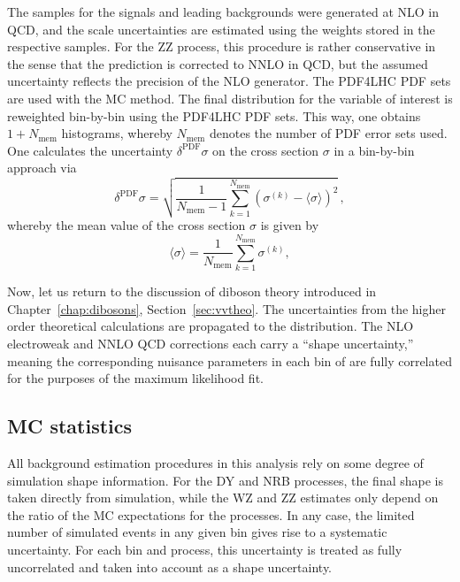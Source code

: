 The samples for the signals and leading backgrounds were generated at NLO in QCD,
and the scale uncertainties are estimated using the weights
stored in the respective samples. For the ZZ process, this procedure is rather conservative
in the sense that the prediction is corrected to NNLO in QCD, but the assumed uncertainty reflects
the precision of the NLO generator.
The PDF4LHC PDF sets are used with the MC method.
The final distribution for the variable of interest is 
reweighted bin-by-bin using the PDF4LHC PDF sets.
This way, one obtains $1+N_{\textrm{mem}}$ histograms, whereby
$N_{\textrm{mem}}$ denotes the number of PDF error sets used. One
calculates the uncertainty $\delta^{\textrm{PDF}}\sigma$ on the cross
section $\sigma$ in a bin-by-bin approach via 
\begin{equation}
\delta^{\textrm{PDF}} \sigma= \sqrt{ \frac{1}{N_{\textrm{mem}} - 1} \sum_{k=1}^{N_{\textrm{mem}}} \left(\sigma^{(k)} - \langle \sigma \rangle\right)^2 }\,,
\end{equation}
whereby the mean value of the cross section $\sigma$ is given by
\begin{equation}
\langle\sigma\rangle = \frac{1}{N_{\textrm{mem}}} \sum_{k=1}^{N_{\textrm{mem}}} \sigma^{(k)},
\end{equation}

Now, let us return to the discussion of diboson theory introduced in Chapter~\ref{chap:dibosons}, Section~\ref{sec:vvtheo}.
The uncertainties from the higher order theoretical calculations are propagated to the \ETm distribution.
The NLO electroweak and NNLO QCD corrections each carry a ``shape uncertainty,''
meaning the corresponding nuisance parameters in each bin of \ETm are fully correlated for the
purposes of the maximum likelihood fit.

\subsection{MC statistics}

All background estimation procedures in this analysis rely on some degree
of simulation shape information.
For the DY and NRB processes, the final shape is taken directly from simulation, 
while the WZ and ZZ estimates only depend on the ratio of the MC expectations for the processes.
In any case, the limited number of simulated events in any given bin gives rise to a systematic uncertainty.
For each bin and process, this uncertainty is treated as fully uncorrelated and taken into account as a shape uncertainty.

